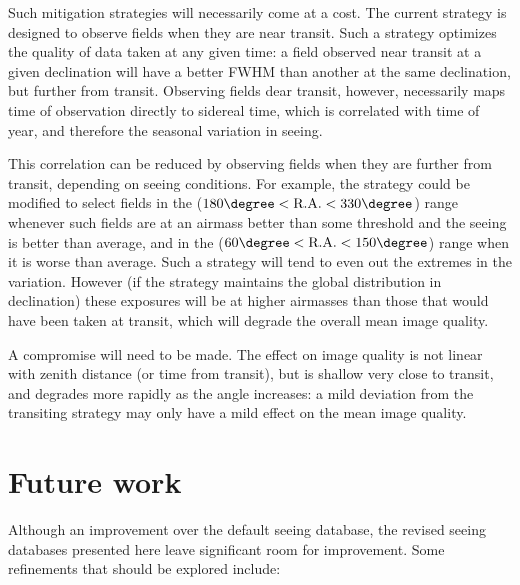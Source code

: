 \documentclass[\docopts]{\docclass}
\begin{document}
Such mitigation strategies will necessarily come at a cost. The
current strategy is designed to observe fields when they are near
transit. Such a strategy optimizes the quality of data taken at any
given time: a field observed near transit at a given declination will
have a better FWHM than another at the same declination, but further
from transit. Observing fields dear transit, however, necessarily maps
time of observation directly to sidereal time, which is correlated
with time of year, and therefore the seasonal variation in seeing.

This correlation can be reduced by observing fields when they are
further from transit, depending on seeing conditions. For example, the
strategy could be modified to select fields in the ($180\degree <
\mbox{R.A.} < 330\degree$) range whenever such fields are at an
airmass better than some threshold and the seeing is better than
average, and in the ($60\degree < \mbox{R.A.} < 150\degree$) range
when it is worse than average. Such a strategy will tend to even out
the extremes in the variation. However (if the strategy maintains the
global distribution in declination) these exposures will be at higher
airmasses than those that would have been taken at transit, which will
degrade the overall mean image quality.

A compromise will need to be made. The effect on image quality is not
linear with zenith distance (or time from transit), but is shallow
very close to transit, and degrades more rapidly as the angle
increases: a mild deviation from the transiting strategy may only have
a mild effect on the mean image quality.

\section{Future work}
\label{sec:future}

Although an improvement over the default seeing database, the revised
seeing databases presented here leave significant room for
improvement. Some refinements that should be explored include:
\end{document}
